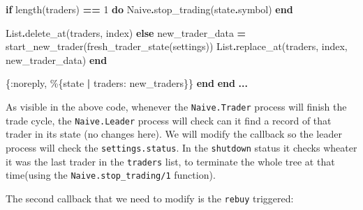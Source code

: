 \documentclass[
]{book}
\newenvironment{Shaded}{\begin{snugshade}}{\end{snugshade}}
\newcommand{\ConstantTok}[1]{\textcolor[rgb]{0.00,0.00,0.00}{#1}}
\newcommand{\ControlFlowTok}[1]{\textcolor[rgb]{0.13,0.29,0.53}{\textbf{#1}}}
\newcommand{\DecValTok}[1]{\textcolor[rgb]{0.00,0.00,0.81}{#1}}
\newcommand{\KeywordTok}[1]{\textcolor[rgb]{0.13,0.29,0.53}{\textbf{#1}}}
\newcommand{\NormalTok}[1]{#1}
\newcommand{\OperatorTok}[1]{\textcolor[rgb]{0.81,0.36,0.00}{\textbf{#1}}}
\newcommand{\VariableTok}[1]{\textcolor[rgb]{0.00,0.00,0.00}{#1}}
\begin{document}
\begin{Shaded}
\begin{Highlighting}[]
            \ControlFlowTok{if}\NormalTok{ length(traders) }\OperatorTok{==} \DecValTok{1} \KeywordTok{do}
              \ConstantTok{Naive}\OperatorTok{.}\NormalTok{stop\_trading(state}\OperatorTok{.}\NormalTok{symbol)}
            \KeywordTok{end}
            
            \ConstantTok{List}\OperatorTok{.}\NormalTok{delete\_at(traders, index)}
          \ControlFlowTok{else}
\NormalTok{            new\_trader\_data }\OperatorTok{=}\NormalTok{ start\_new\_trader(fresh\_trader\_state(settings))}
            \ConstantTok{List}\OperatorTok{.}\NormalTok{replace\_at(traders, index, new\_trader\_data)}
          \KeywordTok{end}

\NormalTok{        \{}\VariableTok{:noreply}\NormalTok{, \%\{state }\OperatorTok{|} \VariableTok{traders:}\NormalTok{ new\_traders\}\}}
    \KeywordTok{end}
  \KeywordTok{end}
  \OperatorTok{...}
\end{Highlighting}
\end{Shaded}

As visible in the above code, whenever the \texttt{Naive.Trader} process will finish the trade cycle, the \texttt{Naive.Leader} process will check can it find a record of that trader in its state (no changes here). We will modify the callback so the leader process will check the \texttt{settings.status}. In the \texttt{shutdown} status it checks wheater it was the last trader in the \texttt{traders} list, to terminate the whole tree at that time(using the \texttt{Naive.stop\_trading/1} function).

The second callback that we need to modify is the \texttt{rebuy} triggered:
\end{document}
